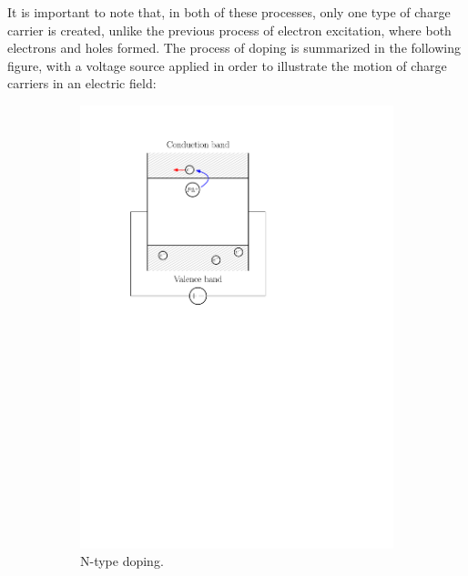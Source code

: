 \documentclass[letterpaper]{article}
\theoremstyle{remark}
\begin{document}
It is important to note that, in both of these processes, only one type of charge carrier is created, unlike the previous process of electron excitation, where both electrons and holes formed. The process of doping is summarized in the following figure, with a voltage source applied in order to illustrate the motion of charge carriers in an electric field:
\begin{figure}[H]
\centering
\begin{subfigure}{.5\textwidth}
\centering
\includegraphics[scale=0.5]{n_type_doping.pdf}
\caption{N-type doping.}
\end{subfigure}%
\begin{subfigure}{.5\textwidth}
\centering

\end{subfigure}
\end{figure}
\end{document}
